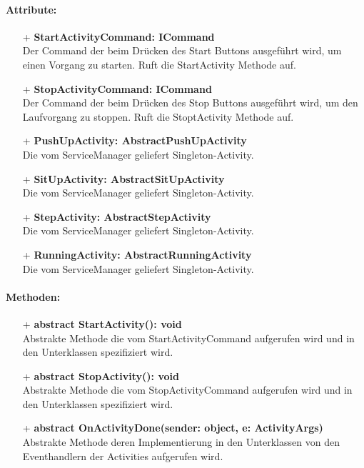 \documentclass[a4paper,12pt]{article}
\begin{document}
\paragraph{Attribute:}
\begin{itemize}
	\item[+] \textbf{StartActivityCommand: ICommand} \\  Der Command der beim Drücken des Start Buttons ausgeführt wird, um einen Vorgang zu starten. Ruft die StartActivity Methode auf.
	\item[+] \textbf{StopActivityCommand: ICommand} \\ Der Command der beim Drücken des Stop Buttons ausgeführt wird, um den Laufvorgang zu stoppen. Ruft die StoptActivity Methode auf.
	\item[+] \textbf{PushUpActivity: AbstractPushUpActivity} \\ Die vom ServiceManager geliefert Singleton-Activity.
	\item[+] \textbf{SitUpActivity: AbstractSitUpActivity} \\ Die vom ServiceManager geliefert Singleton-Activity.
	\item[+] \textbf{StepActivity: AbstractStepActivity} \\ Die vom ServiceManager geliefert Singleton-Activity.
	\item[+] \textbf{RunningActivity: AbstractRunningActivity} \\ Die vom ServiceManager geliefert Singleton-Activity.
\end{itemize} 
\paragraph{Methoden:}
\begin{itemize}
	\item[+] \textbf{abstract StartActivity(): void} \\ Abstrakte Methode die vom StartActivityCommand aufgerufen wird und in den Unterklassen spezifiziert wird.
	\item[+] \textbf{abstract StopActivity(): void} \\ Abstrakte Methode die vom StopActivityCommand aufgerufen wird und in den Unterklassen spezifiziert wird.
	\item[+] \textbf{abstract OnActivityDone(sender: object, e: ActivityArgs)} \\ Abstrakte Methode deren Implementierung in den Unterklassen von den Eventhandlern der Activities aufgerufen wird.
\end{itemize}
\end{document}
